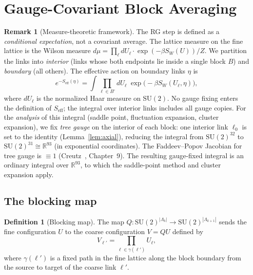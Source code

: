 \documentclass[11pt]{article}
\theoremstyle{definition}
\newtheorem{definition}[theorem]{Definition}
\newtheorem{remark}[theorem]{Remark}
\newcommand{\SU}{\mathrm{SU}}
\newcommand{\R}{\mathbb{R}}
\begin{document}
\section{Gauge-Covariant Block Averaging}\label{sec:blocking}

\begin{remark}[Measure-theoretic framework]\label{rem:measure}
The RG step is defined as a \emph{conditional expectation},
not a covariant average.  The lattice measure on the fine lattice
is the Wilson measure
$d\mu=\prod_\ell dU_\ell\cdot\exp(-\beta S_W(U))/Z$.
We partition the links into \emph{interior} (links whose both
endpoints lie inside a single block $B$) and \emph{boundary}
(all others).  The effective action on boundary links $\eta$ is
\[
e^{-S_{\mathrm{eff}}(\eta)}=\int\prod_{\ell\in B^\circ}dU_\ell
\;\exp\bigl(-\beta S_W(U_\ell,\eta)\bigr),
\]
where $dU_\ell$ is the normalized Haar measure on $\SU(2)$.
No gauge fixing enters the definition of $S_{\mathrm{eff}}$; the
integral over interior links includes all gauge copies.
For the \emph{analysis} of this integral (saddle point,
fluctuation expansion, cluster expansion), we fix \emph{tree gauge}
on the interior of each block: one interior link $\ell_0$ is set
to the identity (Lemma~\ref{lem:axial}), reducing the integral
from $\SU(2)^{32}$ to $\SU(2)^{31}\cong\R^{93}$ (in exponential
coordinates).  The Faddeev--Popov Jacobian for tree gauge is
$\equiv 1$ (Creutz~\cite{Creutz}, Chapter~9).
The resulting gauge-fixed integral is an ordinary integral
over $\R^{93}$, to which the saddle-point method and
cluster expansion apply.
\end{remark}

\subsection{The blocking map}

\begin{definition}[Blocking map]\label{def:blockingmap}
The map $Q:\SU(2)^{|\Lambda_k|}\to\SU(2)^{|\Lambda_{k+1}|}$ sends the
fine configuration $U$ to the coarse configuration $V=QU$ defined by
\begin{equation}
V_{\ell'}=\prod_{\ell\in\gamma(\ell')}U_\ell,
\end{equation}
where $\gamma(\ell')$ is a fixed path in the fine lattice along the
block boundary from the source to target of the coarse link $\ell'$.
\end{definition}
\end{document}
